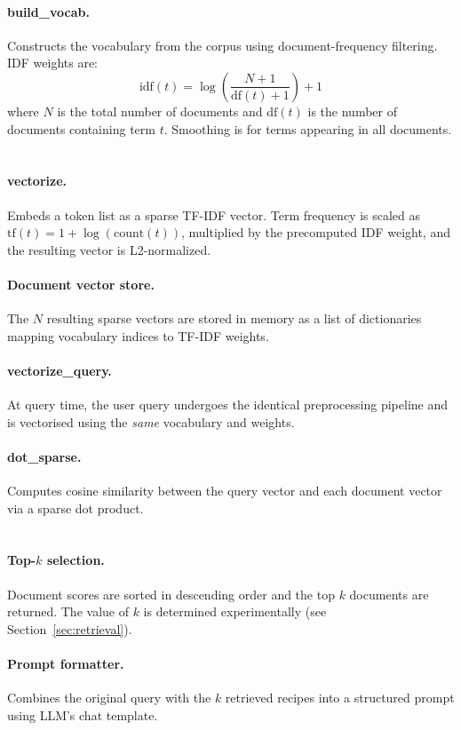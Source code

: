 \documentclass[a4paper,11pt]{article}
\begin{document}
\paragraph{build\_vocab.}
Constructs the vocabulary from the corpus using document-frequency filtering. IDF weights are:
\[
    \mathrm{idf}(t) = \log\!\left(\frac{N+1}{\mathrm{df}(t)+1}\right) + 1
\]
where $N$ is the total number of documents and $\mathrm{df}(t)$ is the number of documents containing term $t$. Smoothing is for terms appearing in all documents.

\paragraph{\\ vectorize.}
Embeds a token list as a sparse TF-IDF vector. Term frequency is scaled as $\mathrm{tf}(t) = 1 + \log(\mathrm{count}(t))$, multiplied by the precomputed IDF weight, and the resulting vector is L2-normalized.

\paragraph{Document vector store.}
The $N$ resulting sparse vectors are stored in memory as a list of dictionaries mapping vocabulary indices to TF-IDF weights.

\paragraph{vectorize\_query.}
At query time, the user query undergoes the identical preprocessing pipeline and is vectorised using the \emph{same} vocabulary and weights.

\paragraph{dot\_sparse.}
Computes cosine similarity between the query vector and each document vector via a sparse dot product.

\paragraph{\\Top-$k$ selection.}
Document scores are sorted in descending order and the top $k$ documents are returned. The value of $k$ is determined experimentally (see Section~\ref{sec:retrieval}).

\paragraph{Prompt formatter.}
Combines the original query with the $k$ retrieved recipes into a structured prompt using LLM's chat template.
\end{document}
